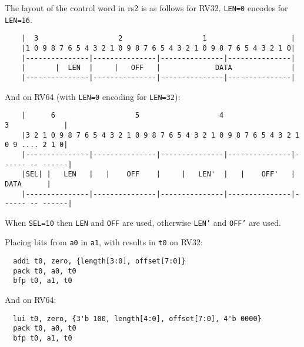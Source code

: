 The layout of the control word in rs2 is as follows for RV32. {\tt LEN=0} encodes for {\tt LEN=16}.

\begin{minipage}{\linewidth}
\begin{verbatim}
    |  3                   2                   1                    |
    |1 0 9 8 7 6 5 4 3 2 1 0 9 8 7 6 5 4 3 2 1 0 9 8 7 6 5 4 3 2 1 0|
    |---------------|---------------|---------------|---------------|
    |       |  LEN  |     |   OFF   |             DATA              |
    |---------------|---------------|---------------|---------------|
\end{verbatim}
\end{minipage}

And on RV64 (with {\tt LEN=0} encoding for {\tt LEN=32}):

\begin{minipage}{\linewidth}
\begin{verbatim}
    |      6                   5                   4                   3             |
    |3 2 1 0 9 8 7 6 5 4 3 2 1 0 9 8 7 6 5 4 3 2 1 0 9 8 7 6 5 4 3 2 1 0 9 .... 2 1 0|
    |---------------|---------------|---------------|---------------|------ -- ------|
    |SEL| |   LEN   |   |    OFF    |     |   LEN'  |   |    OFF'   |      DATA      |
    |---------------|---------------|---------------|---------------|------ -- ------|
\end{verbatim}
\end{minipage}

When {\tt SEL=10} then {\tt LEN} and {\tt OFF} are used, otherwise {\tt LEN'} and {\tt OFF'} are used.

Placing bits from {\tt a0} in {\tt a1}, with results in {\tt t0} on RV32:

\begin{minipage}{\linewidth}
\begin{verbatim}
  addi t0, zero, {length[3:0], offset[7:0]}
  pack t0, a0, t0
  bfp t0, a1, t0
\end{verbatim}
\end{minipage}

And on RV64:

\begin{minipage}{\linewidth}
\begin{verbatim}
  lui t0, zero, {3'b 100, length[4:0], offset[7:0], 4'b 0000}
  pack t0, a0, t0
  bfp t0, a1, t0
\end{verbatim}
\end{minipage}

